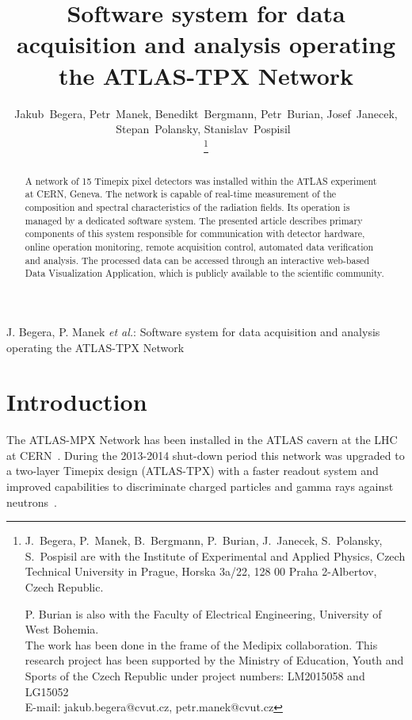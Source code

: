 \documentclass[journal]{IEEEtran}
\begin{document}
\title{Software system for data acquisition and analysis operating the ATLAS-TPX Network}

\author{Jakub~Begera, Petr~Manek, Benedikt~Bergmann, Petr~Burian, Josef~Janecek, Stepan~Polansky, Stanislav~Pospisil~

\thanks{J.~Begera, P.~Manek, B.~Bergmann, P.~Burian, J.~Janecek, S.~Polansky, S.~Pospisil are with the Institute of Experimental and Applied Physics, Czech Technical University in Prague, Horska 3a/22, 128 00 Praha 2-Albertov, Czech Republic.

P. Burian is also with the Faculty of Electrical Engineering, University of West Bohemia.\protect\\
The work has been done in the frame of the Medipix collaboration. This research project has been supported by the Ministry of Education, Youth and Sports of the Czech Republic under project numbers: LM2015058 and LG15052\protect\\
E-mail: jakub.begera@cvut.cz, petr.manek@cvut.cz}
}

\markboth{}%
{J. Begera, P. Manek \MakeLowercase{\textit{et al.}}: Software system for data acquisition and analysis operating the ATLAS-TPX Network}


\maketitle


\begin{abstract}
A network of 15 Timepix pixel detectors was installed within the ATLAS experiment at CERN, Geneva. The network is capable of real-time measurement of the composition and spectral characteristics of the radiation fields. Its operation is managed by a dedicated software system. The presented article describes primary components of this system responsible for communication with detector hardware, online operation monitoring, remote acquisition control, automated data verification and analysis. The processed data can be accessed through an interactive web-based Data Visualization Application, which is publicly available to the scientific community.
\end{abstract}

\section{\label{sec:introduction}Introduction}
The ATLAS-MPX Network has been installed in the ATLAS cavern at the LHC at CERN~\cite{CampbellATLAS}. During the 2013-2014 shut-down period this network was upgraded to a two-layer Timepix design (ATLAS-TPX) with a faster readout system and improved capabilities to discriminate charged particles and gamma rays against neutrons~\cite{Proposal_Claude}.
\end{document}
